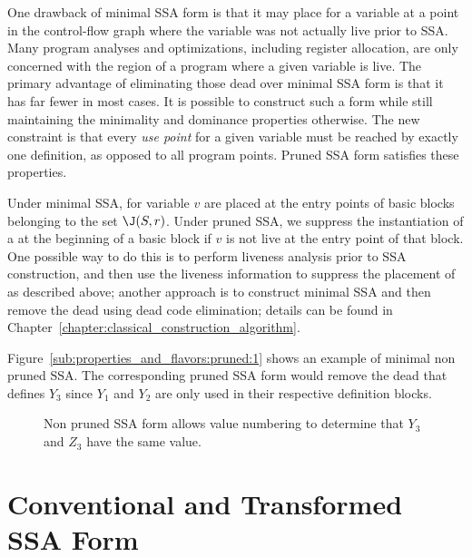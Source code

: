 One drawback of minimal SSA form is that it may place \phifuns
for a variable at a point in the control-flow graph where the variable was
not actually live prior to SSA. Many program analyses and optimizations,
including register allocation, are only concerned with the region of a 
program where a given variable is live. 
The primary advantage of eliminating those dead \phifuns over minimal SSA form
is that it has far fewer \phifuns in most cases.  
It is possible to construct such a form while still maintaining the minimality
and dominance properties otherwise. The new constraint is that every
\emph{use point} for a given variable must be reached by exactly one
definition, as opposed to all program points. Pruned SSA form satisfies these properties. 

Under minimal SSA, \phifuns for variable $v$ are placed at
the entry points of basic blocks belonging to the set $\J(S,r)$. 
Under pruned SSA, we suppress the instantiation of a \phifun
at the beginning of a basic block if $v$ is not live
at the entry point of that block. One possible way to do this is to
perform liveness analysis prior to SSA construction, and then
use the liveness information to suppress the placement of \phifuns
as described above; another approach is to construct minimal SSA
and then remove the dead \phifuns using dead code
elimination; details can be found in Chapter~\ref{chapter:classical_construction_algorithm}.

Figure~\ref{sub:properties_and_flavors:pruned:1} shows an example of minimal non pruned SSA.
The corresponding pruned SSA form would remove the dead \phifun that defines $Y_3$ since $Y_1$ and $Y_2$ are only used in their respective definition blocks.

\begin{figure}
\begin{center}
\caption{Non pruned SSA form allows value numbering to determine that $Y_3$ and $Z_3$ have the same value.}
\label{fig:properties_and_flavors:pruned}
\end{center}
\end{figure}




\section{Conventional and Transformed SSA Form}
\label{sec-prop-conventional}

